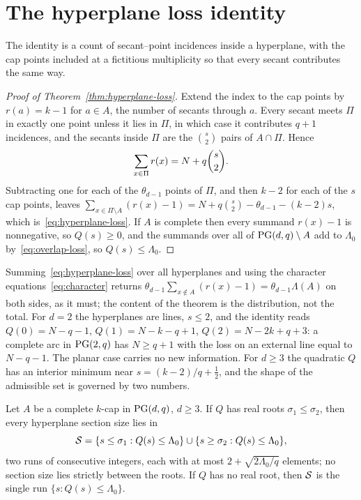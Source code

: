 \section{The hyperplane loss identity}
\label{sec:hyperplane-loss}

The identity is a count of secant--point incidences inside a hyperplane,
with the cap points included at a fictitious multiplicity so that every
secant contributes the same way.

\begin{proof}[Proof of Theorem~\ref{thm:hyperplane-loss}]
Extend the index to the cap points by \(r(a)=k-1\) for \(a\in A\), the
number of secants through \(a\).  Every secant meets \(\Pi\) in exactly
one point unless it lies in \(\Pi\), in which case it contributes
\(q+1\) incidences, and the secants inside \(\Pi\) are the
\(\binom{s}{2}\) pairs of \(A\cap\Pi\).  Hence
\[
 \sum_{x\in\Pi}r(x)=N+q\binom{s}{2}.
\]
Subtracting one for each of the \(\theta_{d-1}\) points of \(\Pi\), and
then \(k-2\) for each of the \(s\) cap points, leaves
\(\sum_{x\in\Pi\setminus A}(r(x)-1)=N+q\binom{s}{2}-\theta_{d-1}-(k-2)s\),
which is~\eqref{eq:hyperplane-loss}.  If \(A\) is complete then every
summand \(r(x)-1\) is nonnegative, so \(Q(s)\ge0\), and the summands over
all of \(\mathrm{PG}(d,q)\setminus A\) add to \(\Lambda_0\)
by~\eqref{eq:overlap-loss}, so \(Q(s)\le\Lambda_0\).
\end{proof}

Summing~\eqref{eq:hyperplane-loss} over all hyperplanes and using the
character equations~\eqref{eq:character} returns
\(\theta_{d-1}\sum_{x\notin A}(r(x)-1)=\theta_{d-1}\Lambda(A)\) on both
sides, as it must; the content of the theorem is the distribution, not
the total.  For \(d=2\) the hyperplanes are lines, \(s\le2\), and the
identity reads \(Q(0)=N-q-1\), \(Q(1)=N-k-q+1\), \(Q(2)=N-2k+q+3\):
a complete arc in \(\mathrm{PG}(2,q)\) has \(N\ge q+1\) with the loss on an
external line equal to \(N-q-1\).  The planar case carries no new
information.  For \(d\ge3\) the quadratic \(Q\) has an interior minimum
near \(s=(k-2)/q+\tfrac12\), and the shape of the admissible set is
governed by two numbers.

\begin{lemma}
\label{lem:admissible-shape}
Let \(A\) be a complete \(k\)-cap in \(\mathrm{PG}(d,q)\), \(d\ge3\).  If
\(Q\) has real roots \(\sigma_1\le\sigma_2\), then every hyperplane
section size lies in
\[
 \mathcal S=\{s\le\sigma_1:Q(s)\le\Lambda_0\}\cup\{s\ge\sigma_2:Q(s)\le\Lambda_0\},
\]
two runs of consecutive integers, each with at most
\(2+\sqrt{2\Lambda_0/q}\) elements; no section size lies strictly between
the roots.  If \(Q\) has no real root, then \(\mathcal S\) is the single run
\(\{s:Q(s)\le\Lambda_0\}\).
\end{lemma}

